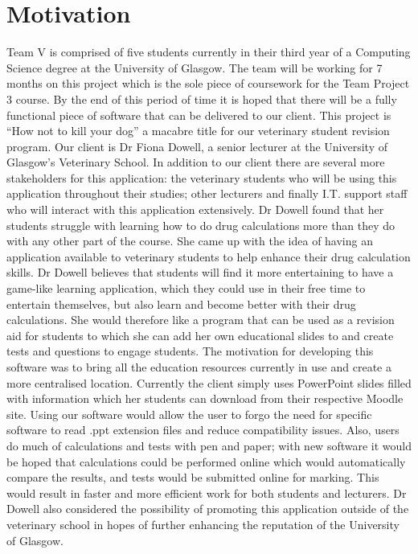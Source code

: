 \documentclass{l3proj}
\begin{document}
\section{Motivation}
Team V is comprised of five students currently in their third year of a Computing Science degree at the University of Glasgow. The team will be working for 7 months on this project which is the sole piece of coursework for the Team Project 3 course. By the end of this period of time it is hoped that there will be a fully functional piece of software that can be delivered to our client.
\newline
\newline
This project is ``How not to kill your dog'' a macabre title for our veterinary student revision program. Our client is Dr Fiona Dowell, a senior lecturer at the University of Glasgow's Veterinary School. In addition to our client there are several more stakeholders for this application: the veterinary students who will be using this application throughout their studies; other lecturers and finally I.T. support staff who will interact with this application extensively.  Dr Dowell found that her students struggle with learning how to do drug calculations more than they do with any other part of the course. She came up with the idea of having an application available to veterinary students to help enhance their drug calculation skills.
\newline
\newline
Dr Dowell believes that students will find it more entertaining to have a game-like learning application, which they could use in their free time to entertain themselves, but also learn and become better with their drug calculations. She would therefore like a program that can be used as a revision aid for students to which she can add her own educational slides to and create tests and questions to engage students.
\newline
\newline
The motivation for developing this software was to bring all the education resources currently in use and create a more centralised location. Currently the client simply uses PowerPoint slides filled with information which her students can download from their respective Moodle site. Using our software would allow the user to forgo the need for specific software to read .ppt extension files and reduce compatibility issues. Also, users do much of calculations and tests with pen and paper; with new software it would be hoped that calculations could be performed online which would automatically compare the results, and tests would be submitted online for marking. This would result in faster and more efficient work for both students and lecturers. Dr Dowell also considered the possibility of promoting this application outside of the veterinary school in hopes of further enhancing the reputation of the University of Glasgow.
\end{document}
